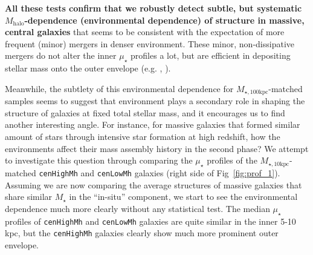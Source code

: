 \documentclass[a4paper,fleqn,usenatbib]{mnras}
\def\rbcg{\texttt{cenHighMh}}
\def\nbcg{\texttt{cenLowMh}}
\def\mstar{{$M_{\star}$}}
\def\mhalo{{$M_{\mathrm{halo}}$}}
\def\minn{{$M_{\star,10\mathrm{kpc}}$}}
\def\mtot{{$M_{\star,100\mathrm{kpc}}$}}
\def\mden{{$\mu_{\star}$}}
\begin{document}
    \textbf{All these tests confirm that we robustly detect subtle, but systematic 
    \mhalo{}-dependence (environmental dependence) of structure in massive, 
    central galaxies} that seems to be consistent with the expectation of more frequent 
    (minor) mergers in denser environment. 
    These minor, non-dissipative mergers do not alter the inner \mden{} profiles 
    a lot, but are efficient in depositing stellar mass onto the outer envelope
    (e.g. \citealt{Hilz2013}, \citealt{Oogi2013}).
    

    Meanwhile, the subtlety of this environmental dependence for \mtot{}-matched 
    samples seems to suggest that environment plays a secondary role in shaping 
    the structure of galaxies at fixed total stellar mass, and it encourages us to find
    another interesting angle.  
    For instance, for massive galaxies that formed similar amount of stars through 
    intensive star formation at high redshift, how the environments affect their mass 
    assembly history in the second phase? 
    We attempt to investigate this question through comparing the \mden{} profiles of 
    the \minn{}-matched \rbcg{} and \nbcg{} galaxies (right side of 
    Fig~\ref{fig:prof_1}).
    Assuming we are now comparing the average structures of massive galaxies that share 
    similar \mstar{} in the ``in-situ'' component, we start to see the environmental 
    dependence much more clearly without any statistical test.     
    The median \mden{} profiles of \rbcg{} and \nbcg{} galaxies are quite similar in 
    the inner 5-10 kpc, but the \rbcg{} galaxies clearly show much more prominent
    outer envelope.     
    
\end{document}

